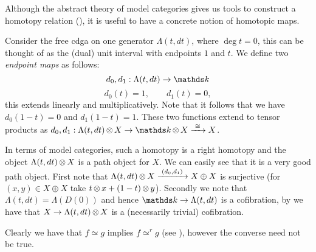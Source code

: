 
Although the abstract theory of model categories gives us tools to construct a homotopy relation (), it is useful to have a concrete notion of homotopic maps.

Consider the free cdga on one generator $\Lambda(t, dt)$, where $\deg{t} = 0$, this can be thought of as the (dual) unit interval with endpoints $1$ and $t$. We define two \emph{endpoint maps} as follows:
$$ d_0, d_1 : \Lambda(t, dt) \to \k $$
$$ d_0(t) = 1, \qquad d_1(t) = 0, $$
this extends linearly and multiplicatively. Note that it follows that we have $d_0(1-t) = 0$ and $d_1(1-t) = 1$. These two functions extend to tensor products as $d_0, d_1: \Lambda(t, dt) \tensor X \to \k \tensor X \tot{\iso} X$.


In terms of model categories, such a homotopy is a right homotopy and the object $\Lambda(t, dt) \operatorname*{\otimes} X$ is a path object for $X$. We can easily see that it is a very good path object. First note that $\Lambda(t, dt) \operatorname*{\otimes} X \xrightarrow{\,\,{(d_0, d_1)}\,\,} X \oplus X$ is surjective (for $(x, y) \in X \oplus X$ take $t \operatorname*{\otimes} x + (1-t) \operatorname*{\otimes} y$). Secondly we note that $\Lambda(t, dt) = \Lambda(D(0))$ and hence $\k \to \Lambda(t, dt)$ is a cofibration, by  we have that $X \to \Lambda(t, dt) \operatorname*{\otimes} X$ is a (necessarily trivial) cofibration.

Clearly we have that $f \simeq g$ implies $f \simeq^r g$ (see ), however the converse need not be true.



